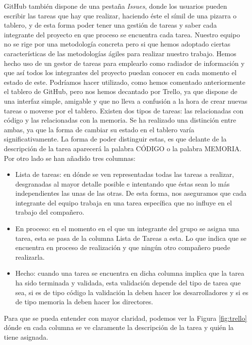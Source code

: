 GitHub también dispone de una pestaña \textit{Issues}, donde los usuarios pueden escribir las tareas que hay que realizar, haciendo éste el símil de una pizarra o tablero, y de esta forma poder tener una gestión de tareas y saber cada integrante del proyecto en que proceso se encuentra cada tarea. 
Nuestro equipo no se rige por una metodología concreta pero si que hemos adoptado ciertas características de las metodologías ágiles para realizar nuestro trabajo.
Hemos hecho uso de un gestor de tareas para emplearlo como radiador de información y que así todos los integrantes del proyecto puedan conocer en cada momento el estado de este. Podríamos hacer utilizado, como hemos comentado anteriormente el tablero de GitHub, pero nos hemos decantado por Trello, ya que dispone de una interfaz simple, amigable y que no lleva a confusión a la hora de crear nuevas tareas o moverse por el tablero.
Existen dos tipos de tareas: las relacionadas con código y las relacionadas con la memoria. Se ha realizado una distinción entre ambas, ya que la forma de cambiar su estado en el tablero varía significativamente. La forma de poder distinguir estas, es que delante de la descripción de la tarea aparecerá la palabra CÓDIGO o la palabra MEMORIA. Por otro lado se han añadido tres columnas:
\begin{itemize}
	\item Lista de tareas: en dónde se ven representadas todas las tareas a realizar, desgranadas al mayor detalle posible e intentando que éstas sean lo más independientes las unas de las otras. De esta forma, nos aseguramos que cada integrante del equipo trabaja en una tarea específica que no influye en el trabajo del compañero.
	\item En proceso: en el momento en el que un integrante del grupo se asigna una tarea, esta se pasa de la columna Lista de Tareas a esta. Lo que indica que se encuentra en proceso de realización y que ningún otro compañero puede realizarla. 
	\item Hecho: cuando una tarea se encuentra en dicha columna implica que la tarea  ha sido terminada y validada, esta validación depende del tipo de tarea que sea, si es de tipo código la validación la deben hacer los desarrolladores y si es de tipo memoria la deben hacer los directores.
	
\end{itemize}

Para que se pueda entender con mayor claridad, podemos ver la Figura \ref{fig:trello} dónde en cada columna se ve claramente la descripción de la tarea y quién la tiene asignada.

